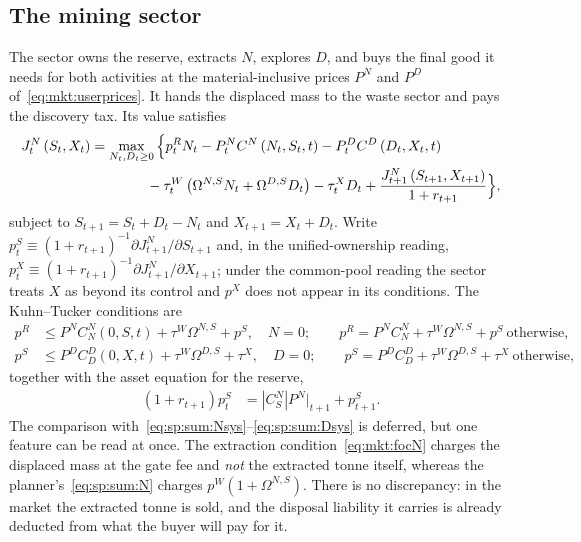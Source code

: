 \subsection{The mining sector}\label{sec:mkt:eq:mine}

The sector owns the reserve, extracts $N$, explores $D$, and buys the final good it needs for both activities at the material-inclusive prices $P^N$ and $P^D$ of~\eqref{eq:mkt:userprices}. It hands the displaced mass to the waste sector and pays the discovery tax. Its value satisfies
\begin{align}
J^N_t\left(S_t,X_t\right) &= \max_{N_t,D_t\ge0}\Big\{p^R_tN_t-P^N_tC^N\left(N_t,S_t,t\right)-P^D_tC^D\left(D_t,X_t,t\right)
\notag\\
&\qquad\qquad
-\tau^W_t\left(\Omega^{N,S}N_t+\Omega^{D,S}D_t\right)-\tau^X_tD_t
+\frac{J^N_{t+1}\left(S_{t+1},X_{t+1}\right)}{1+r_{t+1}}\Big\},
\label{eq:mkt:mineJ}
\end{align}
subject to $S_{t+1}=S_t+D_t-N_t$ and $X_{t+1}=X_t+D_t$. Write $p^S_t\equiv\left(1+r_{t+1}\right)^{-1}\partial J^N_{t+1}/\partial S_{t+1}$ and, in the unified-ownership reading, $p^X_t\equiv\left(1+r_{t+1}\right)^{-1}\partial J^N_{t+1}/\partial X_{t+1}$; under the common-pool reading the sector treats $X$ as beyond its control and $p^X$ does not appear in its conditions. The Kuhn--Tucker conditions are
\begin{subequations}
\label{eq:mkt:focmine}
\begin{align}
p^R &\le P^NC^N_N\left(0,S,t\right)+\tau^W\Omega^{N,S}+p^S,\quad N=0;
\qquad
p^R = P^NC^N_N+\tau^W\Omega^{N,S}+p^S \ \text{otherwise},
\label{eq:mkt:focN}
\\
p^S &\le P^DC^D_D\left(0,X,t\right)+\tau^W\Omega^{D,S}+\tau^X,\quad D=0;
\qquad
p^S = P^DC^D_D+\tau^W\Omega^{D,S}+\tau^X \ \text{otherwise},
\label{eq:mkt:focD}
\end{align}
\end{subequations}
together with the asset equation for the reserve,
\begin{align}
\left(1+r_{t+1}\right)p^S_t &= \left|C^N_S\right|P^N\Big|_{t+1}+p^S_{t+1}.
\label{eq:mkt:pS}
\end{align}
The comparison with~\eqref{eq:sp:sum:Nsys}--\eqref{eq:sp:sum:Dsys} is deferred, but one feature can be read at once. The extraction condition~\eqref{eq:mkt:focN} charges the displaced mass at the gate fee and \emph{not} the extracted tonne itself, whereas the planner's~\eqref{eq:sp:sum:N} charges $p^W\left(1+\Omega^{N,S}\right)$. There is no discrepancy: in the market the extracted tonne is sold, and the disposal liability it carries is already deducted from what the buyer will pay for it.


